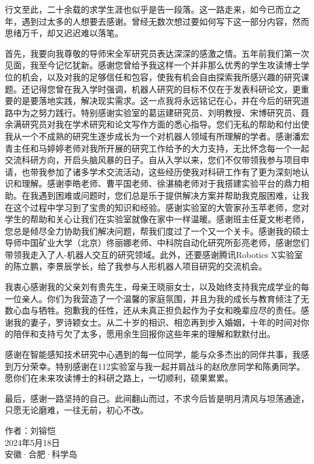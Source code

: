 
\begin{acknowledgements}

行文至此，二十余载的求学生涯也似乎是告一段落。这一路走来，如今已而立之年，遇到过太多的人想要去感谢。曾经无数次想过要如何写下这一部分内容，然而思绪万千，却又迟迟难以落笔。

首先，我要向我尊敬的导师宋全军研究员表达深深的感激之情。五年前我们第一次见面，我至今记忆犹新。感谢您曾给予我这样一个并非那么优秀的学生攻读博士学位的机会，以及对我的足够信任和包容，使我有机会自由探索我所感兴趣的研究课题。还记得您曾在我入学时强调，机器人研究的目标不仅在于发表科研论文，更重要的是要落地实践，解决现实需求。这一点我将永远铭记在心，并在今后的研究道路中为之努力践行。特别感谢实验室的葛运建研究员、刘明教授、宋博研究员、聂余满研究员对我在学术研究和论文写作方面的悉心指导。您们无私的帮助和付出使我从一个不成熟的研究生逐步成长为一个对机器人领域有所理解的学者。感谢潘宏青主任和马婷婷老师对我所开展的研究工作给予的大力支持，无比怀念每一个一起交流科研方向，开启头脑风暴的日子。自从入学以来，您们不仅带领我参与项目申请，也带我参加了诸多学术交流活动，这些经历使我对科研工作有了更为深刻地认识和理解。感谢李皓老师、曹平国老师、徐湛楠老师对于我搭建实验平台的鼎力相助。在我遇到困难或问题时，您们总是乐于提供解决方案并帮助我克服困难，让我在这个过程中学习到了宝贵的知识和经验。感谢实验室的大管家孙玉苹老师，您对学生的帮助和关心让我们在实验室就像在家中一样温暖。感谢班主任夏文彬老师，您总是倾尽全力协助我们解决问题，帮我们度过了一个又一个关卡。感谢我的硕士导师中国矿业大学（北京）佟丽娜老师、中科院自动化研究所彭亮老师，感谢您们带领我走入了人-机器人交互的研究领域。此外，还要感谢腾讯Robotics X实验室的陈立鹏，李景辰学长，给了我参与人形机器人项目研究的交流机会。

我衷心感谢我的父亲刘有贵先生，母亲王晓丽女士，以及始终支持我完成学业的每一位亲人。你们为我营造了一个温馨的家庭氛围，并且为我的成长与教育倾注了无数心血与牺牲。抱歉我的任性，还从未真正担负起作为子女和晚辈应尽的责任。感谢我的妻子，罗诗颖女士。从二十岁的相识、相恋再到步入婚姻，十年的时间对你的陪伴和支持亏欠了太多，愿用余生回报你这些年来的理解和默默付出。

感谢在智能感知技术研究中心遇到的每一位同学，能与众多杰出的同伴共事，我感到万分荣幸。特别感谢在112实验室与我一起并肩战斗的赵欣彦同学和陈勇同学。愿你们在未来攻读博士的科研之路上，一切顺利，硕果累累。

最后，感谢一路坚持的自己。此间翻山而过，不求今后皆是明月清风与坦荡通途，只愿无论磨难，一往无前，初心不改。
\newline
\newline
\begin{flushright}
    作者：刘镕恺\\

    2024年5月18日\\

    安徽·合肥·科学岛
\end{flushright}

\end{acknowledgements}
